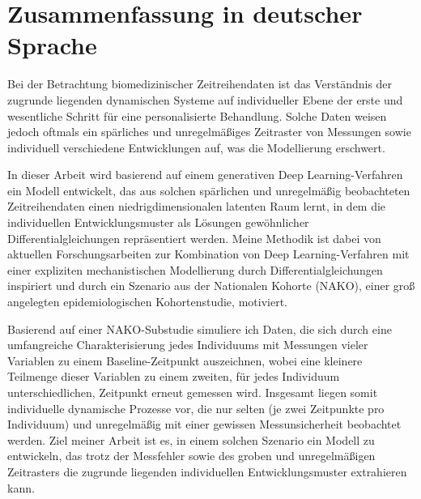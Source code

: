 \chapter*{Zusammenfassung in deutscher Sprache}


Bei der Betrachtung biomedizinischer Zeitreihendaten ist das Verständnis der zugrunde liegenden dynamischen Systeme auf individueller Ebene der erste und wesentliche Schritt für eine personalisierte Behandlung. Solche Daten weisen jedoch oftmals ein spärliches und unregelmäßiges Zeitraster von Messungen sowie individuell verschiedene Entwicklungen auf, was die Modellierung erschwert. 

In dieser Arbeit wird basierend auf einem generativen Deep Learning-Verfahren ein Modell entwickelt, das aus solchen spärlichen und unregelmäßig beobachteten Zeitreihendaten einen niedrigdimensionalen latenten Raum lernt, in dem die individuellen Entwicklungsmuster als Lösungen gewöhnlicher Differentialgleichungen repräsentiert werden. Meine Methodik ist dabei von aktuellen Forschungsarbeiten zur Kombination von Deep Learning-Verfahren mit einer expliziten mechanistischen Modellierung durch Differentialgleichungen inspiriert und durch ein Szenario aus der Nationalen Kohorte (NAKO), einer groß angelegten epidemiologischen Kohortenstudie, motiviert.

Basierend auf einer NAKO-Substudie simuliere ich Daten, die sich durch eine umfangreiche Charakterisierung jedes Individuums mit Messungen vieler Variablen zu einem Baseline-Zeitpunkt auszeichnen, wobei eine kleinere Teilmenge dieser Variablen zu einem zweiten, für jedes Individuum unterschiedlichen, Zeitpunkt erneut gemessen wird. Insgesamt liegen somit individuelle dynamische Prozesse vor, die nur selten (je zwei Zeitpunkte pro Individuum) und unregelmäßig mit einer gewissen Messunsicherheit beobachtet werden. 
Ziel meiner Arbeit ist es, in einem solchen Szenario ein Modell zu entwickeln, das trotz der Messfehler sowie des groben und unregelmäßigen Zeitrasters die zugrunde liegenden individuellen Entwicklungsmuster extrahieren kann. 

